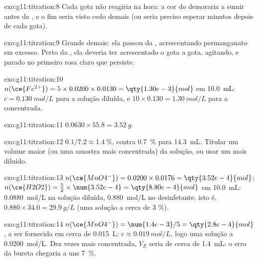 \begin{solution}{exo:g11:titration:8}
Cada gota não reagiria na hora: a cor do  demoraria a sumir
antes da , e o fim seria visto cedo demais (ou seria preciso
esperar minutos depois de cada gota).
\end{solution}

\begin{solution}{exo:g11:titration:9}
Grande demais: ela passou da , acrescentando permanganato em
excesso. Perto da , ela deveria ter acrescentado o 
gota a gota, agitando, e parado no primeiro rosa claro que persiste.
\end{solution}

\begin{solution}{exo:g11:titration:10}
$n(\ce{Fe^{2+}}) = 5 \times 0.0200 \times 0.0130 = \qty{1.30e-3}{mol}$ em
\qty{10.0}{mL}: $c = \qty{0.130}{mol/L}$ para a solução diluída, e
$10 \times 0.130 = \qty{1.30}{mol/L}$ para a concentrada.
\end{solution}

\begin{solution}{exo:g11:titration:11}
$0.0630 \times 55.8 = \qty{3.52}{g}$.
\end{solution}

\begin{solution}{exo:g11:titration:12}
$0.1 / 7.2 \approx \qty{1.4}{\percent}$, contra
\qty{0.7}{\percent} para \qty{14.3}{mL}. Titular um volume maior (ou uma
amostra mais concentrada) da solução, ou usar um  mais
diluído.
\end{solution}

\begin{solution}{exo:g11:titration:13}
$n(\ce{MnO4^-}) = 0.0200 \times 0.0176 = \qty{3.52e-4}{mol}$;
$n(\ce{H2O2}) = \frac{5}{2} \times \num{3.52e-4} = \qty{8.80e-4}{mol}$ em
\qty{10.0}{mL}: \qty{0.0880}{mol/L} na solução diluída,
\qty{0.880}{mol/L} no desinfetante, isto é,
$0.880 \times 34.0 = \qty{29.9}{g/L}$ (uma solução a cerca de 3 \%).
\end{solution}

\begin{solution}{exo:g11:titration:14}
$n(\ce{MnO4^-}) = \num{1.4e-3} / 5 = \qty{2.8e-4}{mol}$, a ser fornecida
em cerca de \qty{0.015}{L}: $c \approx \qty{0.019}{mol/L}$, logo uma
solução a \qty{0.0200}{mol/L}. Dez vezes mais concentrada, $V_E$ seria
de cerca de \qty{1.4}{mL}: o erro da bureta chegaria a uns
\qty{7}{\percent}.
\end{solution}

